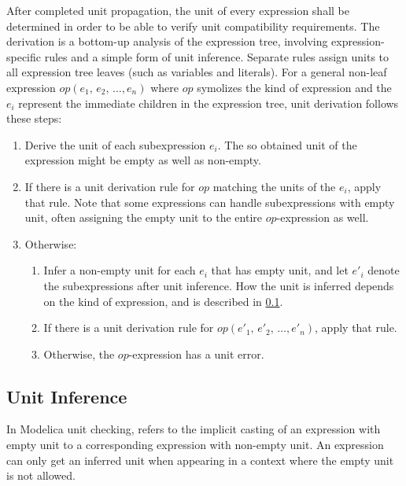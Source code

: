 After completed unit propagation, the unit of every expression shall be determined in order to be able to verify unit compatibility requirements.
The derivation is a bottom-up analysis of the expression tree, involving expression-specific rules and a simple form of unit inference.
Separate rules assign units to all expression tree leaves (such as variables and literals).
For a general non-leaf expression $\mathit{op}(e_{1},\, e_{2},\, \ldots, e_{n})$ where $\mathit{op}$ symolizes the kind of expression and the $e_{i}$ represent the immediate children in the expression tree, unit derivation follows these steps:
\begin{enumerate}
\item
  Derive the unit of each subexpression $e_{i}$.
  The so obtained unit of the expression might be empty as well as non-empty.
\item
  If there is a unit derivation rule for $\mathit{op}$ matching the units of the $e_{i}$, apply that rule.
  Note that some expressions can handle subexpressions with empty unit, often assigning the empty unit to the entire $\mathit{op}$-expression as well.
\item
  Otherwise:
  \begin{enumerate}
  \def\labelenumii{\alph{enumii}.}
  \item
    Infer a non-empty unit for each $e_{i}$ that has empty unit, and let $e'_{i}$ denote the subexpressions after unit inference.
    How the unit is inferred depends on the kind of expression, and is described in \cref{unit-inference}.
  \item
    If there is a unit derivation rule for $\mathit{op}(e'_{1},\, e'_{2},\, \ldots, e'_{n})$, apply that rule.
  \item
    Otherwise, the $\mathit{op}$-expression has a unit error.
  \end{enumerate}
\end{enumerate}


\subsection{Unit Inference}\label{unit-inference}

In Modelica unit checking,  refers to the implicit casting of an expression with empty unit to a corresponding expression with non-empty unit.
An expression can only get an inferred unit when appearing in a context where the empty unit is not allowed.

